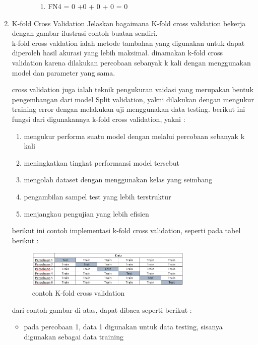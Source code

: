\begin{enumerate}
\begin{enumerate}
\begin{itemize}
\begin{enumerate}
        \item FN4  = 0 +0 + 0 + 0 = 0
    \end{enumerate}
\end{itemize}
\end{enumerate}
\item K-fold Cross Validation
Jelaskan bagaimana K-fold cross validation bekerja dengan gambar ilustrasi contoh buatan sendiri.\\
k-fold cross valdation ialah metode tambahan yang digunakan untuk dapat diperoleh hasil akurasi yang lebih maksimal. dinamakan k-fold cross validation karena dilakukan percobaan sebanyak k kali dengan menggunakan model dan parameter yang sama.\\
\par cross validation juga ialah teknik pengukuran vaidasi yang merupakan bentuk pengembangan dari model Split validation, yakni dilakukan dengan mengukur training error dengan melakukan uji menggunakan data testing.
berikut ini fungsi dari digunakannya k-fold cross validation, yakni :\\
\begin{enumerate}
    \item mengukur performa suatu model dengan melalui percobaan sebanyak k kali
    \item meningkatkan tingkat performansi model tersebut
    \item mengolah dataset dengan menggunakan kelas yang seimbang
    \item pengambilan sampel test yang lebih terstruktur
    \item menjangkau pengujian yang lebih efisien
\end{enumerate}
berikut ini contoh implementasi k-fold cross validation, seperti pada tabel berikut :
\begin{figure}[H]
    \centering
    \includegraphics[width=0.75\textwidth]{figures/k-fold.png}
    \caption{contoh K-fold cross validation}
    \label{fig:my_label}
\end{figure}
dari contoh gambar di atas, dapat dibaca seperti berikut :
\begin{itemize}
    \item pada percobaan 1, data 1 digunakan untuk data testing, sisanya digunakan sebagai data training

\end{itemize}
\end{enumerate}
